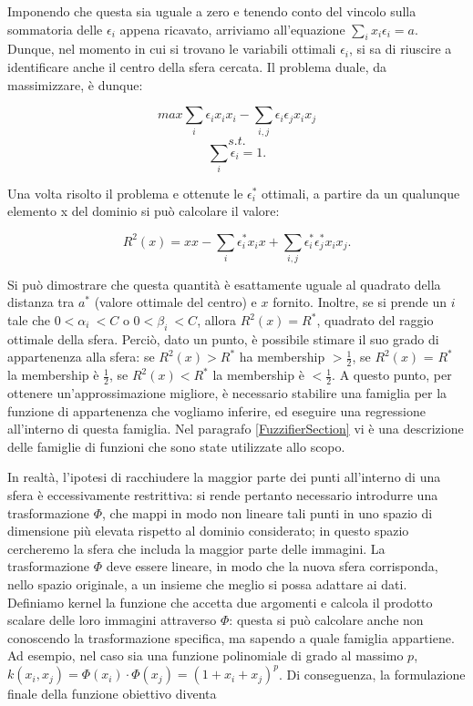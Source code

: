 \documentclass[12pt,a4paper]{report}
\begin{document}
Imponendo che questa sia uguale a zero e tenendo conto del vincolo sulla sommatoria delle $\epsilon_i$ appena ricavato,  arriviamo all'equazione  $\sum_{i}x_i\epsilon_i = a$. Dunque, nel momento in cui si trovano le variabili ottimali $\epsilon_i$, si sa di riuscire a identificare anche il centro della sfera cercata.
Il problema duale, da massimizzare, è dunque:

\[ max \sum_{i}\epsilon_ix_ix_i - \sum_{i,j}\epsilon_i\epsilon_jx_ix_j\]
\[s.t.\]
\[\sum_i\epsilon_i = 1.\]

Una volta risolto il problema e ottenute le $\epsilon_i^*$ ottimali, a partire da un qualunque elemento x del dominio si può calcolare il valore:

\[ R^2(x) = xx - \sum_{i}\epsilon_i^*x_ix + \sum_{i,j}\epsilon_i^*\epsilon_j^*x_ix_j.\]

Si può dimostrare che questa quantità è esattamente uguale al quadrato della distanza tra $a^*$ (valore ottimale del centro) e $x$ fornito. Inoltre,  se si prende un $i$ tale che $0 < \alpha_{i}\ < C$ o $0 < \beta_{i}\ < C$,  allora $R^2(x) = R^*$, quadrato del raggio ottimale della sfera.
Perciò, dato un punto, è possibile stimare il suo grado di appartenenza alla sfera: se $R^2(x) > R^*$ ha membership $>\frac{1}{2}$, se $R^2(x)$ = $R^*$ la membership è  $\frac{1}{2}$, se $R^2(x)  < R^*$ la membership è  $< \frac{1}{2}$.
A questo punto, per ottenere un'approssimazione migliore, è necessario stabilire una famiglia per la funzione di appartenenza che vogliamo inferire, ed eseguire una regressione all'interno di questa famiglia. Nel paragrafo \ref{FuzzifierSection} vi è una descrizione delle famiglie di funzioni che sono state utilizzate allo scopo.

In realtà, l'ipotesi di racchiudere la maggior parte dei punti all'interno di una sfera è eccessivamente restrittiva: si rende pertanto necessario introdurre una trasformazione  $\Phi$, che mappi in modo non lineare tali punti in uno spazio di dimensione più elevata rispetto al dominio considerato; in questo spazio cercheremo la sfera che includa la maggior parte delle immagini.
La trasformazione $\Phi$ deve essere lineare, in modo che la nuova sfera corrisponda, nello spazio originale, a un insieme che meglio si possa adattare ai dati. Definiamo kernel la funzione che accetta due argomenti e calcola il prodotto scalare delle loro immagini attraverso $\Phi$: questa si può calcolare anche non conoscendo la trasformazione specifica, ma sapendo a quale famiglia appartiene. Ad esempio, nel caso sia una funzione polinomiale di grado al massimo $p$, $k(x_i, x_j) = \Phi(x_i)\cdot \Phi(x_j) = (1 + x_i + x_j)^p$.
Di conseguenza, la formulazione finale della funzione obiettivo diventa
\end{document}
